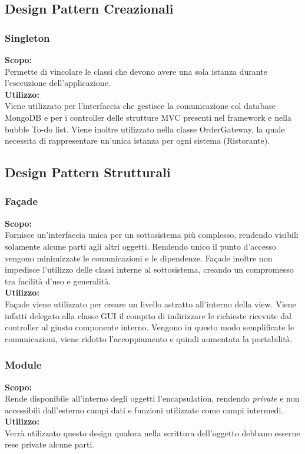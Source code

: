 \subsection{Design Pattern Creazionali}

\subsubsection{Singleton}
\textbf{Scopo:} \\
Permette di vincolare le classi che devono avere una sola istanza durante l'esecuzione dell'applicazione.\\
\textbf{Utilizzo:} \\
Viene utilizzato per l'interfaccia che gestisce la comunicazione col database MongoDB e per i controller delle strutture MVC presenti nel framework e nella bubble To-do list. Viene inoltre utilizzato nella classe Order\-Gateway, la quale necessita di rappresentare un'unica istanza per ogni sistema (Ristorante).

\subsection{Design Pattern Strutturali}

\subsubsection{Fa\c{c}ade}
\textbf{Scopo:} \\
Fornisce un'interfaccia unica per un sottosistema più complesso, rendendo visibili solamente alcune parti agli altri oggetti. Rendendo unico il punto d'accesso vengono minimizzate le comunicazioni e le dipendenze. Fa\c{c}ade inoltre non impedisce l'utilizzo delle classi interne al sottosistema, creando un compromesso tra facilità d'uso e generalità. \\
\textbf{Utilizzo:} \\ 
Fa\c{c}ade viene utilizzato per creare un livello astratto all'interno della view. Viene infatti delegato alla classe GUI il compito di indirizzare le richieste ricevute dal controller al giusto componente interno. Vengono in questo modo semplificate le comunicazioni, viene ridotto l'accoppiamento e quindi aumentata la portabilità. 

\subsubsection{Module}
\textbf{Scopo:} \\
Rende disponibile all'interno degli oggetti l'encapsulation, rendendo \textit{private} e non accessibili dall'esterno campi dati e funzioni utilizzate come campi intermedi.\\
\textbf{Utilizzo:} \\
Verrà utilizzato questo design qualora nella scrittura dell'oggetto debbano esserne rese private alcune parti.

